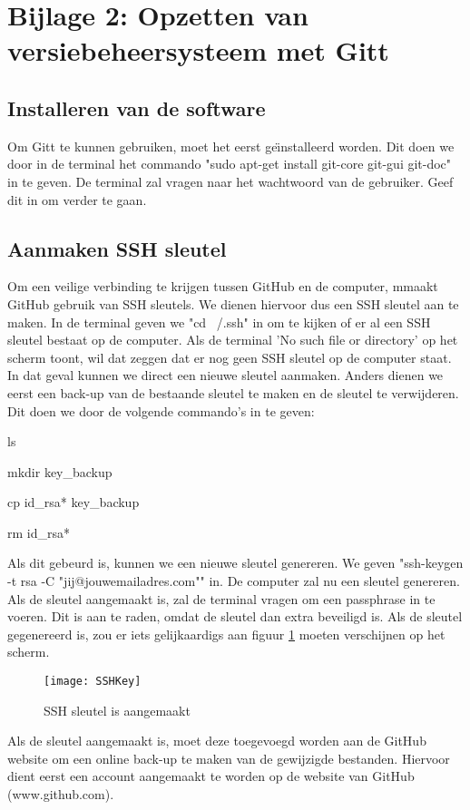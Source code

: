 \documentclass[12pt]{article}
\begin{document}
\section{Bijlage 2: Opzetten van versiebeheersysteem met Gitt}
\subsection{Installeren van de software}
Om Gitt te kunnen gebruiken, moet het eerst ge\"{\i}nstalleerd worden. Dit doen we door in de terminal het commando "sudo apt-get install git-core git-gui git-doc" in te geven. De terminal zal vragen naar het wachtwoord van de gebruiker. Geef dit in om verder te gaan.
\subsection{Aanmaken SSH sleutel}
Om een veilige verbinding te krijgen tussen GitHub en de computer, mmaakt GitHub gebruik van SSH sleutels. We dienen hiervoor dus een SSH sleutel aan te maken. In de terminal geven we "cd ~/.ssh" in om te kijken of er al een SSH sleutel bestaat op de computer. Als de terminal 'No such file or directory' op het scherm toont, wil dat zeggen dat er nog geen SSH sleutel op de computer staat. In dat geval kunnen we direct een nieuwe sleutel aanmaken. Anders dienen we eerst een back-up van de bestaande sleutel te maken en de sleutel te verwijderen. Dit doen we door de volgende commando's in te geven:


ls


mkdir key\_backup


cp id\_rsa* key\_backup


rm id\_rsa*


Als dit gebeurd is, kunnen we een nieuwe sleutel genereren. We geven "ssh-keygen -t rsa -C "jij@jouwemailadres.com"" in. De computer zal nu een sleutel genereren. Als de sleutel aangemaakt is, zal de terminal vragen om een passphrase in te voeren. Dit is aan te raden, omdat de sleutel dan extra beveiligd is. Als de sleutel gegenereerd is, zou er iets gelijkaardigs aan figuur \ref{ssh} moeten verschijnen op het scherm.

\begin{figure} [!ht]
\begin{center}
	\texttt{[image: SSHKey]}
\end{center}
	\caption{SSH sleutel is aangemaakt}
	\label{ssh}
\end{figure}

Als de sleutel aangemaakt is, moet deze toegevoegd worden aan de GitHub website om een online back-up te maken van de gewijzigde bestanden. Hiervoor dient eerst een account aangemaakt te worden op de website van GitHub (www.github.com). 
\end{document}
